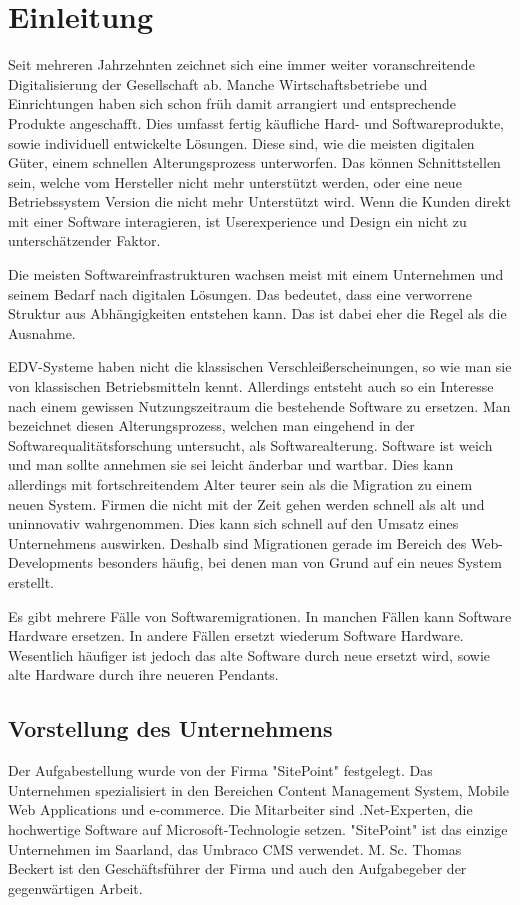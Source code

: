 \chapter{Einleitung}

Seit mehreren Jahrzehnten zeichnet sich eine immer weiter voranschreitende  Digitalisierung der Gesellschaft ab. Manche Wirtschaftsbetriebe und Einrichtungen haben sich schon früh damit arrangiert und entsprechende Produkte angeschafft. Dies umfasst fertig käufliche Hard- und Softwareprodukte, sowie individuell entwickelte Lösungen. Diese sind, wie die meisten digitalen Güter, einem schnellen Alterungsprozess unterworfen. Das können Schnittstellen sein, welche vom Hersteller nicht mehr unterstützt werden, oder eine neue Betriebssystem Version die nicht mehr Unterstützt wird. Wenn die Kunden direkt mit einer Software interagieren, ist Userexperience und Design ein nicht zu unterschätzender Faktor.

Die meisten Softwareinfrastrukturen wachsen meist mit einem Unternehmen und seinem Bedarf nach digitalen Lösungen. Das bedeutet, dass eine verworrene Struktur aus Abhängigkeiten entstehen kann. Das ist dabei eher die Regel als die Ausnahme.

\ac{EDV}-Systeme haben nicht die klassischen Verschleißerscheinungen, so wie man sie von klassischen Betriebsmitteln kennt. Allerdings entsteht auch so ein Interesse nach einem gewissen Nutzungszeitraum die bestehende Software zu ersetzen. Man bezeichnet diesen Alterungsprozess, welchen man eingehend in der Softwarequalitätsforschung untersucht, als Softwarealterung. Software ist \glqq weich\grqq{} und man sollte annehmen sie sei leicht änderbar und wartbar. Dies kann allerdings mit fortschreitendem Alter teurer sein als die Migration zu einem neuen System. Firmen die nicht mit der Zeit gehen werden schnell als alt und uninnovativ wahrgenommen. Dies kann sich schnell auf den Umsatz eines Unternehmens auswirken. Deshalb sind Migrationen gerade im Bereich des Web-Developments besonders häufig, bei denen man von Grund auf ein neues System erstellt.

Es gibt mehrere Fälle von Softwaremigrationen. In manchen Fällen kann Software Hardware ersetzen. In andere Fällen ersetzt wiederum Software Hardware. Wesentlich häufiger ist jedoch das alte Software durch neue ersetzt wird, sowie alte Hardware durch ihre neueren Pendants. 

\section{Vorstellung des Unternehmens}
Der Aufgabestellung wurde von der Firma "SitePoint" festgelegt. Das Unternehmen spezialisiert in den Bereichen Content Management System, Mobile Web Applications und e-commerce. Die Mitarbeiter sind .Net-Experten, die hochwertige Software auf Microsoft-Technologie setzen. "SitePoint" ist das einzige Unternehmen im Saarland, das Umbraco CMS verwendet. M. Sc. Thomas Beckert ist den Geschäftsführer der Firma und auch den Aufgabegeber der gegenwärtigen Arbeit. \cite{SitePoint2018}  


